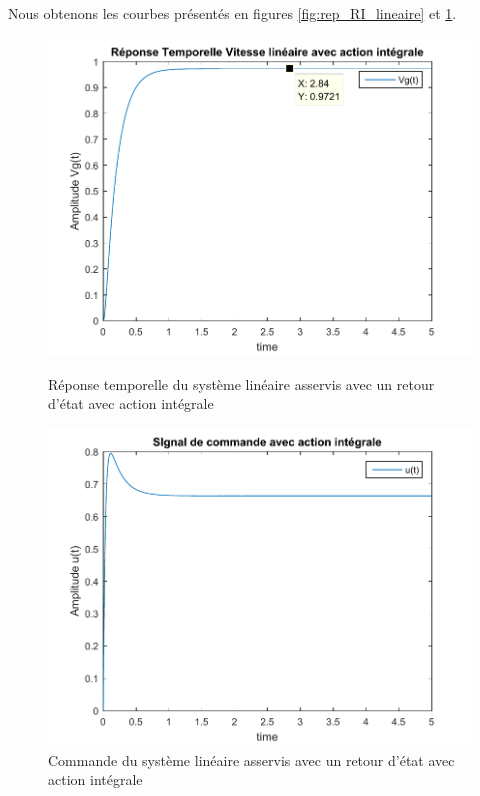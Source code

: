 Nous obtenons les courbes présentés en figures \ref{fig:rep_RI_lineaire} et \ref{fig:com_RI_lineaire}.
\begin{figure}[!ht]
\begin{minipage}{.5\textwidth}
\includegraphics[width = \textwidth]{./IV/images/rep_RI_lineaire5s.pdf}
\caption{Réponse temporelle du système linéaire asservis avec un retour d'état avec action intégrale\label{fig:rep_RI_lineaire}}
\end{minipage}
\begin{minipage}{.5\textwidth}
\includegraphics[width = \textwidth]{./IV/images/com_RI_lineaire5s.pdf}
\caption{Commande du système linéaire asservis avec un retour d'état avec action intégrale\label{fig:com_RI_lineaire}}
\end{minipage}
\end{figure}
